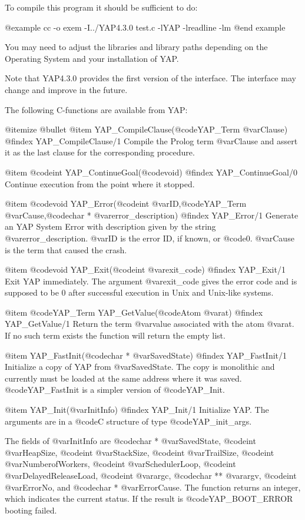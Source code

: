 {{{{{{{{To compile this program it should be sufficient to do:

@example
cc -o exem -I../YAP4.3.0 test.c -lYAP -lreadline -lm
@end example

You may need to adjust the libraries and library paths depending on the
Operating System and your installation of YAP.

Note that YAP4.3.0 provides the first version of the interface. The
interface may change and improve in the future.

The following C-functions are available from YAP:

@itemize @bullet
@item  YAP_CompileClause(@code{YAP_Term} @var{Clause})
@findex  YAP_CompileClause/1
Compile the Prolog term @var{Clause} and assert it as the last clause
for the corresponding procedure.

@item  @code{int} YAP_ContinueGoal(@code{void})
@findex YAP_ContinueGoal/0
Continue execution from the point where it stopped.

@item  @code{void} YAP_Error(@code{int} @var{ID},@code{YAP_Term} @var{Cause},@code{char *} @var{error_description})
@findex YAP_Error/1
Generate an YAP System Error with description given by the string
@var{error_description}. @var{ID} is the error ID, if known, or
@code{0}. @var{Cause} is the term that caused the crash.

@item  @code{void} YAP_Exit(@code{int} @var{exit_code})
@findex YAP_Exit/1
Exit YAP immediately. The argument @var{exit_code} gives the error code
and is supposed to be 0 after successful execution in Unix and Unix-like
systems.

@item  @code{YAP_Term} YAP_GetValue(@code{Atom} @var{at})
@findex  YAP_GetValue/1
Return the term @var{value} associated with the atom @var{at}. If no
such term exists the function will return the empty list.

@item  YAP_FastInit(@code{char *} @var{SavedState})
@findex  YAP_FastInit/1
Initialize a copy of YAP from @var{SavedState}. The copy is
monolithic and currently must be loaded at the same address where it was
saved. @code{YAP_FastInit} is a simpler version of @code{YAP_Init}.

@item  YAP_Init(@var{InitInfo})
@findex  YAP_Init/1
Initialize YAP. The arguments are in a @code{C}
structure of type @code{YAP_init_args}.

The fields of @var{InitInfo} are @code{char *} @var{SavedState},
@code{int} @var{HeapSize}, @code{int} @var{StackSize}, @code{int}
@var{TrailSize}, @code{int} @var{NumberofWorkers}, @code{int}
@var{SchedulerLoop}, @code{int} @var{DelayedReleaseLoad}, @code{int}
@var{argc}, @code{char **} @var{argv}, @code{int} @var{ErrorNo}, and
@code{char *} @var{ErrorCause}. The function returns an integer, which
indicates the current status. If the result is @code{YAP_BOOT_ERROR}
booting failed.

}}}}}}}}
